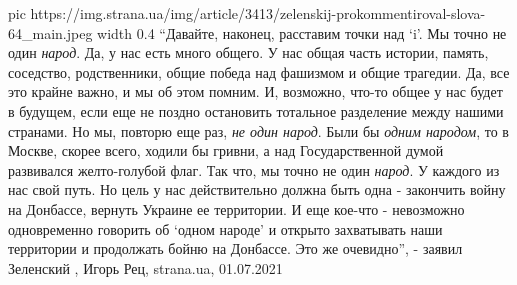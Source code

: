 \ifcmt
  pic https://img.strana.ua/img/article/3413/zelenskij-prokommentiroval-slova-64_main.jpeg
	width 0.4
\fi
\enquote{Давайте, наконец, расставим точки над \enquote{i}. Мы точно не один
\emph{народ}. Да, у нас есть много общего. У нас общая часть истории, память,
соседство, родственники, общие победа над фашизмом и общие трагедии. Да, все
это крайне важно, и мы об этом помним. И, возможно, что-то общее у нас будет в
будущем, если еще не поздно остановить тотальное разделение между нашими
странами. Но мы, повторю еще раз, \emph{не один народ}. Были бы \emph{одним народом}, то в
Москве, скорее всего, ходили бы гривни, а над Государственной думой развивался
желто-голубой флаг. Так что, мы точно не один \emph{народ}. У каждого из нас свой
путь. Но цель у нас действительно должна быть одна - закончить войну на
Донбассе, вернуть Украине ее территории. И еще кое-что - невозможно
одновременно говорить об \enquote{одном народе} и открыто захватывать наши
территории и продолжать бойню на Донбассе.  Это же очевидно}, - заявил
Зеленский
, Игорь Рец, strana.ua, 01.07.2021

